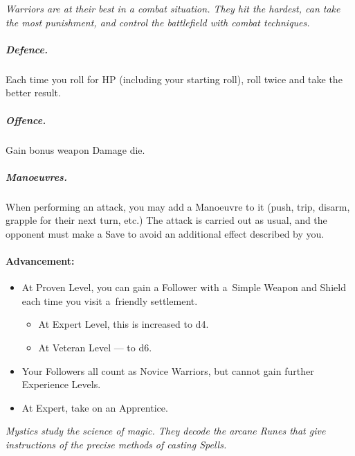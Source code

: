 \documentclass[itdr/core]{subfiles}
\begin{document}

\begin{comment}
Every character chooses a Class from the following:

\textbf{Warrior:} An adept of martial training.

\textbf{Mystic:} A student of runic magic.

\textbf{Disciple:} A devoted follower of a set of teachings.
\end{comment}

{\em Warriors are at their best in a combat situation. They hit the hardest, can take the most punishment, and control the battlefield with combat techniques.}

\subparagraph{Defence.} Each time you roll for HP (including your starting roll), roll twice and take the better result.

\subparagraph{Offence.}
Gain bonus weapon Damage die.

\subparagraph{Manoeuvres.}
When performing an attack, you may add a Manoeuvre to it (push, trip, disarm, grapple for their next turn, etc.) The attack is carried out as usual, and the opponent must make a Save to avoid an additional effect described by you.

\paragraph*{Advancement:}
\begin{itemize}
	\item At Proven Level, you can gain a Follower with a~Simple Weapon and Shield each time you visit a~friendly settlement.
	\begin{itemize}
		\item At Expert Level, this is increased to d4.
		\item At Veteran Level --- to d6.
	\end{itemize}
	\item Your Followers all count as Novice Warriors, but cannot gain further Experience Levels. \item At Expert, take on an Apprentice.
\end{itemize}

\vfill


\enlargethispage{\baselineskip}

\vfill
\break

{\em Mystics study the science of magic. They decode the arcane Runes that give instructions of the precise methods of casting Spells.}
\end{document}
